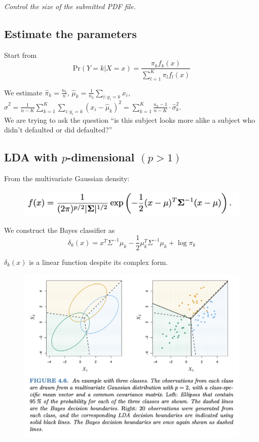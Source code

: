 \documentclass{article}
\begin{document}
\textit{Control the size of the submitted PDF file.}

\subsection{Estimate the parameters}
Start from 
$$\mathrm{Pr}(Y = k \vert X = x) = \frac{\pi_k f_k(x)}{\sum_{l=1}^K \pi_l f_l(x)}$$

We estimate $\displaystyle\hat{\pi}_k = \frac{n_k}{n}$, $\displaystyle\hat{\mu}_k = \frac{1}{n_k}\sum_{i: y_i = k}x_i$, $\displaystyle\hat{\sigma}^2 = \frac{1}{n - K}\sum_{k=1}^K \sum_{i: y_i = k}(x_i - \hat{\mu}_k)^2 = \sum_{k=1}^K \frac{n_k -1}{n - K}\cdot \hat{\sigma}_k^2.$\\

We are trying to ask the question ``is this subject looks more alike a subject who didn't defaulted or did defaulted?''

\subsection{LDA with $p$-dimensional $(p > 1)$}

From the multivariate Gaussian density:

\begin{figure}[h!]
    \centering
    \includegraphics[width=0.75\linewidth]{Multi_Gaussian.png}
    \label{multi_gaussian}
\end{figure}

We construct the Bayes classifier as $$\delta_k(x) = x^T \Sigma^{-1}\mu_k - \frac{1}{2}\mu_k^T \Sigma^{-1}\mu_k + \log \pi_k$$

$\delta_k(x)$ is a linear function despite its complex form.

\begin{figure}[h!]
    \centering
    \includegraphics[width=0.75\linewidth]{Bayes_boundaries.png}
    \label{Bayes_boundaries}
\end{figure}
\end{document}
